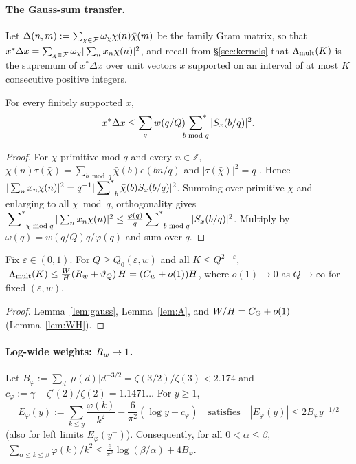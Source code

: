 \paragraph{The Gauss-sum transfer.}
Let $\Delta(n,m):=\sum_{\chi\in\mathcal{F}}\omega_\chi\chi(n)\bar\chi(m)$ be the family Gram matrix, so that
$x^*\Delta x=\sum_{\chi\in\mathcal{F}}\omega_\chi|\sum_nx_n\chi(n)|^2$, and recall from \S\ref{sec:kernels} that $\Lambda_{\mathrm{mult}}(K)$ is the supremum of
$x^*\Delta x$ over unit vectors $x$ supported on an interval of at most $K$ consecutive positive integers.

\begin{lemma}\label{lem:gauss}
For every finitely supported $x$,
\[
 x^*\Delta x\le\sum_{q}w(q/Q)\sideset{}{^*}\sum_{b\bmod q}|S_x(b/q)|^2 .
\]
\end{lemma}

\begin{proof}
For $\chi$ primitive mod $q$ and every $n\in\mathbb Z$, $\chi(n)\tau(\bar\chi)=\sum_{b\bmod q}\bar\chi(b)e(bn/q)$ and
$|\tau(\bar\chi)|^2=q$ \cite[\S3.4]{IK04}. Hence
$|\sum_nx_n\chi(n)|^2=q^{-1}|\sideset{}{^*}\sum_{b}\bar\chi(b)S_x(b/q)|^2$. Summing over primitive $\chi$ and enlarging to all
$\chi\bmod q$, orthogonality gives $\sideset{}{^*}\sum_{\chi\bmod q}|\sum_nx_n\chi(n)|^2\le\frac{\varphi(q)}q\sideset{}{^*}\sum_{b\bmod q}|S_x(b/q)|^2$.
Multiply by $\omega(q)=w(q/Q)q/\varphi(q)$ and sum over $q$.
\end{proof}

\begin{corollary}\label{cor:LmultA}
Fix $\varepsilon\in(0,1)$. For $Q\ge Q_0(\varepsilon,w)$ and all $K\le Q^{2-\varepsilon}$,
$\ \Lambda_{\mathrm{mult}}(K)\le\frac WH(R_w+\vartheta_Q)\,H=(C_w+o(1))H$, where $o(1)\to0$ as $Q\to\infty$ for fixed $(\varepsilon,w)$.
\end{corollary}

\begin{proof}
Lemma~\ref{lem:gauss}, Lemma~\ref{lem:A}, and $W/H=C_{\mathrm G}+o(1)$ (Lemma~\ref{lem:WH}).
\end{proof}

\paragraph{Log-wide weights: $R_w\to1$.}

\begin{lemma}\label{lem:harm}
Let $B_\varphi:=\sum_d|\mu(d)|d^{-3/2}=\zeta(3/2)/\zeta(3)<2.174$ and $c_\varphi:=\gamma-\zeta'(2)/\zeta(2)=1.1471\ldots$ For
$y\ge1$,
\[
 E_\varphi(y):=\sum_{k\le y}\frac{\varphi(k)}{k^2}-\frac6{\pi^2}(\log y+c_\varphi)\quad\text{satisfies}\quad |E_\varphi(y)|\le2B_\varphi y^{-1/2}
\]
(also for left limits $E_\varphi(y^-)$). Consequently, for all $0<\alpha\le\beta$,
$\ \sum_{\alpha\le k\le\beta}\varphi(k)/k^2\le\frac6{\pi^2}\log(\beta/\alpha)+4B_\varphi$.
\end{lemma}

